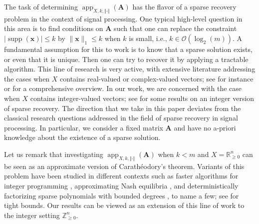 \documentclass[pdflatex]{sn-jnl}
\DeclareMathOperator{\app}{app}
\DeclareMathOperator{\supp}{supp}
\newcommand{\R}{\mathbb{R}}
\newcommand{\Z}{\mathbb{Z}}
\newcommand{\bA}{\bm{A}}
\newcommand{\bx}{\bm{x}}
\theoremstyle{thmstyleone}%
\theoremstyle{thmstyletwo}%
\theoremstyle{thmstylethree}%
\begin{document}
	The task of determining $\app_{X,k,\Vert\cdot\Vert}(\bA)$ has the flavor of a sparse recovery problem in the context of signal processing. One typical high-level question in this area is to find conditions on $\bA$ such that one can replace the constraint $\left|\supp(\bx)\right|\leq k$ by $\|\bx\|_1 \leq k$ when $k$ is small, i.e., $k \in\mathcal{O}(\log_2(m))$. A fundamental assumption for this to work  is to know that a sparse solution exists, or even that it is unique. Then one can try to recover it by applying a tractable algorithm. This line of research is very active, with extensive literature addressing the cases when $X$ contains real-valued or complex-valued vectors; see for instance \cite{Candes2006Robust,Candes2006Stable,Candes2005Decoding,Candes2007Dantzig,Donoho2006Compressed} or \cite{foucart_rauhut_2013} for a comprehensive overview. In our work, we are concerned with the case when $X$ contains integer-valued vectors; see \cite{alasmari2023unique,flinth2018promp,fukshansky2019algebraic,konyagin2018recovery} for some results on an integer version of sparse recovery. 
	The direction that we take in this paper deviates from the classical research questions addressed in the field of sparse recovery in signal processing. In particular, we consider a fixed matrix $\bA$ and have no a-priori knowledge about the existence of a sparse solution.
	
	Let us remark that investigating $\app_{X,k,\Vert\cdot\Vert}(\bA)$ when $k<m$ and $X = \R^n_{\geq 0}$ can be seen as an approximate version of Carath\'eodory's theorem. Variants of this problem have been studied in different contexts such as faster algorithms for integer programming \cite{approx_to_exact}, approximating Nash equilibria \cite{nash_equilibria}, and deterministically factorizing sparse polynomials with bounded degrees \cite{deterministic_factorization}, to name a few; see \cite{pmlr-v70-mirrokni17a} for tight bounds. Our results can be viewed as an extension of this line of work to the integer setting $\Z^n_{\geq 0}$.
	
\end{document}
